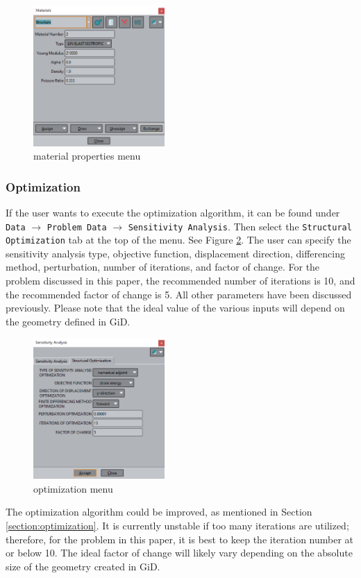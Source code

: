 \begin{figure}[ht]
  \centering
  \includegraphics[width=50mm]{images/GiD_materials.png}
  \caption{material properties menu}
  \label{fig:GiDMaterialsMenu}
\end{figure}

\subsubsection{Optimization}
If the user wants to execute the optimization algorithm, it can be found under \texttt{Data} $\rightarrow$ \texttt{Problem Data} $\rightarrow$ \texttt{Sensitivity Analysis}. Then select the \texttt{Structural Optimization} tab at the top of the menu. See Figure \ref{fig:GiDOptimizationMenu}. The user can specify the sensitivity analysis type, objective function, displacement direction, differencing method, perturbation, number of iterations, and factor of change. For the problem discussed in this paper, the recommended number of iterations is 10, and the recommended factor of change is 5. All other parameters have been discussed previously. Please note that the ideal value of the various inputs will depend on the geometry defined in GiD.\\[3pt]
\begin{figure}[ht]
  \centering
  \includegraphics[width=50mm]{images/GiD_optimization.png}
  \caption{optimization menu}
  \label{fig:GiDOptimizationMenu}
\end{figure}
The optimization algorithm could be improved, as mentioned in Section \ref{section:optimization}. It is currently unstable if too many iterations are utilized; therefore, for the problem in this paper, it is best to keep the iteration number at or below 10. The ideal factor of change will likely vary depending on the absolute size of the geometry created in GiD.

